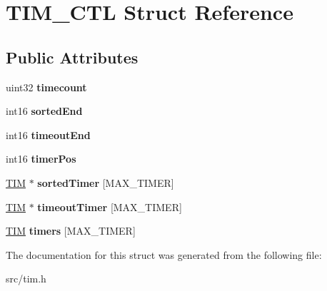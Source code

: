 \hypertarget{struct_t_i_m___c_t_l}{}\section{T\+I\+M\+\_\+\+C\+T\+L Struct Reference}
\label{struct_t_i_m___c_t_l}
\subsection*{Public Attributes}
\begin{DoxyCompactItemize}
\item 
\hypertarget{struct_t_i_m___c_t_l_afe0057071a298e74a33e0cafc274dc72}{}uint32 {\bfseries timecount}\label{struct_t_i_m___c_t_l_afe0057071a298e74a33e0cafc274dc72}

\item 
\hypertarget{struct_t_i_m___c_t_l_af8ab7aaf7a65c49b7037cd22f4ce9657}{}int16 {\bfseries sorted\+End}\label{struct_t_i_m___c_t_l_af8ab7aaf7a65c49b7037cd22f4ce9657}

\item 
\hypertarget{struct_t_i_m___c_t_l_a098ff5e98e3bc73b84986b2088e0fd16}{}int16 {\bfseries timeout\+End}\label{struct_t_i_m___c_t_l_a098ff5e98e3bc73b84986b2088e0fd16}

\item 
\hypertarget{struct_t_i_m___c_t_l_a3dafbceb68e0869b76cf2f8b4a5debb8}{}int16 {\bfseries timer\+Pos}\label{struct_t_i_m___c_t_l_a3dafbceb68e0869b76cf2f8b4a5debb8}

\item 
\hypertarget{struct_t_i_m___c_t_l_a8f80afa7c6acce372c049f458c5a5a02}{}\hyperlink{struct_t_i_m}{T\+I\+M} $\ast$ {\bfseries sorted\+Timer} \mbox{[}M\+A\+X\+\_\+\+T\+I\+M\+E\+R\mbox{]}\label{struct_t_i_m___c_t_l_a8f80afa7c6acce372c049f458c5a5a02}

\item 
\hypertarget{struct_t_i_m___c_t_l_a12bf67bb030fb1541a1c3b6dee389624}{}\hyperlink{struct_t_i_m}{T\+I\+M} $\ast$ {\bfseries timeout\+Timer} \mbox{[}M\+A\+X\+\_\+\+T\+I\+M\+E\+R\mbox{]}\label{struct_t_i_m___c_t_l_a12bf67bb030fb1541a1c3b6dee389624}

\item 
\hypertarget{struct_t_i_m___c_t_l_acafdd510c09bd838bd8467be77f29afb}{}\hyperlink{struct_t_i_m}{T\+I\+M} {\bfseries timers} \mbox{[}M\+A\+X\+\_\+\+T\+I\+M\+E\+R\mbox{]}\label{struct_t_i_m___c_t_l_acafdd510c09bd838bd8467be77f29afb}

\end{DoxyCompactItemize}


The documentation for this struct was generated from the following file\+:\begin{DoxyCompactItemize}
\item 
src/tim.\+h\end{DoxyCompactItemize}
